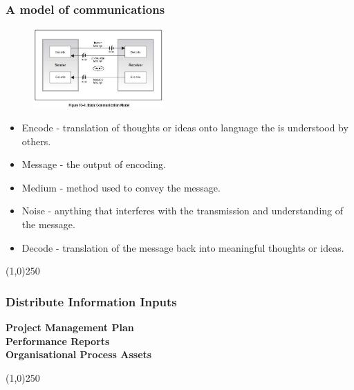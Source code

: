 \begin{frame}
\frametitle{A model of communications}
\begin{figure}
	\centering
		\includegraphics[width = 5cm]{images/Fig10-4.jpg}
	\label{fig:10-4}
\end{figure}
\begin{itemize}
	\item Encode - translation of thoughts or ideas onto language the is understood by others. 
	\item Message - the output of encoding.
	\item Medium - method used to convey the message.
	\item Noise - anything that interferes with the transmission and understanding of the message.
	\item Decode - translation of the message back into meaningful thoughts or ideas.
\end{itemize}
\end{frame}\begin{center}\line(1,0){250}\end{center}



\begin{frame}
\frametitle{Distribute Information \hfill\hfill Inputs}
\textbf{Project Management Plan}\\
\textbf{Performance Reports}\\
\textbf{Organisational Process Assets}\\

\end{frame}\begin{center}\line(1,0){250}\end{center}


